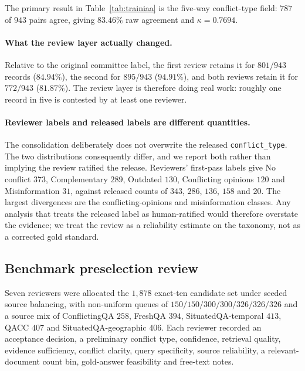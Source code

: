 

The primary result in Table~\ref{tab:trainiaa} is the five-way conflict-type
field: $787$ of $943$ pairs agree, giving $83.46\%$ raw agreement and
$\kappa=0.7694$.

\paragraph{What the review layer actually changed.} Relative to the original
committee label, the first review retains it for $801/943$ records ($84.94\%$),
the second for $895/943$ ($94.91\%$), and both reviews retain it for $772/943$
($81.87\%$). The review layer is therefore doing real work: roughly one record in
five is contested by at least one reviewer.

\paragraph{Reviewer labels and released labels are different quantities.} The
consolidation deliberately does not overwrite the released \texttt{conflict\_type}.
The two distributions consequently differ, and we report both rather than
implying the review ratified the release. Reviewers' first-pass labels give
No conflict $373$, Complementary $289$, Outdated $130$, Conflicting opinions
$120$ and Misinformation $31$, against released counts of $343$, $286$, $136$,
$158$ and $20$. The largest divergences are the conflicting-opinions and
misinformation classes. Any analysis that treats the released label as
human-ratified would therefore overstate the evidence; we treat the review as a
reliability estimate on the taxonomy, not as a corrected gold standard.

\subsection{Benchmark preselection review}

Seven reviewers were allocated the $1{,}878$ exact-ten candidate set under seeded
source balancing, with non-uniform queues of $150/150/300/300/326/326/326$ and a
source mix of ConflictingQA $258$, FreshQA $394$, SituatedQA-temporal $413$,
QACC $407$ and SituatedQA-geographic $406$. Each reviewer recorded an acceptance
decision, a preliminary conflict type, confidence, retrieval quality, evidence
sufficiency, conflict clarity, query specificity, source reliability, a
relevant-document count bin, gold-answer feasibility and free-text notes.

